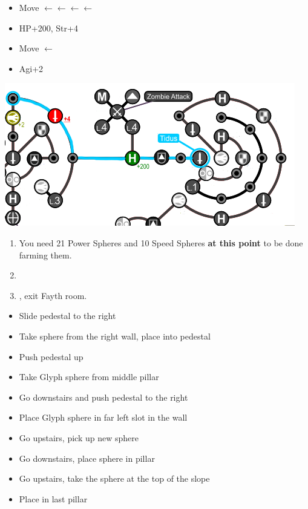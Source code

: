 \begin{spheregrid}
    \begin{itemize}
        \tidusf
        \begin{itemize}
            \item Move $\leftarrow\leftarrow\leftarrow\leftarrow$
            \item HP+200, Str+4
            \item Move $\leftarrow$
            \item Agi+2
        \end{itemize}
        \includegraphics[width=.8\columnwidth]{graphics/Tidus_Post_Seymour}
    \end{itemize}
\end{spheregrid}
\winvfill
\begin{enumerate}[resume]
    \item You need 21 Power Spheres and 10 Speed Spheres \textbf{at this point} to be done farming them.
    \item \formation{\rikku}{\tidus}{\yuna}
    \item \save, exit Fayth room.
\end{enumerate}
\begin{trial}
    \begin{itemize}
        \item Slide pedestal to the right
        \item Take sphere from the right wall, place into pedestal
        \item Push pedestal up
        \item Take Glyph sphere from middle pillar
        \item Go downstairs and push pedestal to the right
        \item Place Glyph sphere in far left slot in the wall
        \item Go upstairs, pick up new sphere
        \item Go downstairs, place sphere in pillar
        \item Go upstairs, take the sphere at the top of the slope
        \item Place in last pillar
    \end{itemize}
\end{trial}
